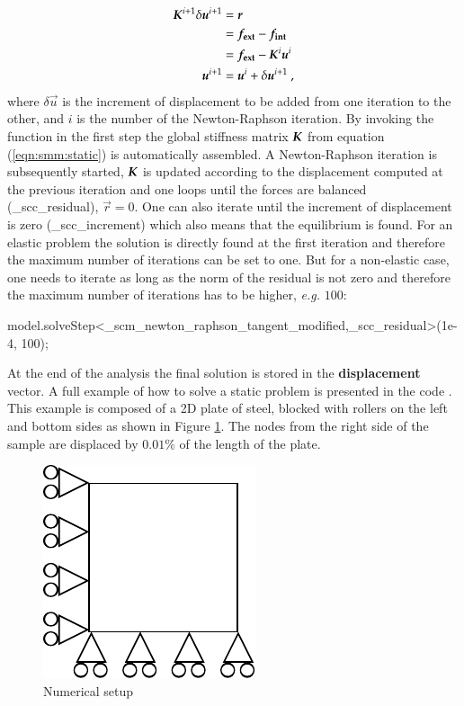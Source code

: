 \begin{align}\label{eqn:smm:static-newton-raphson} 
\boldsymbol{K}^{i+1}\delta\boldsymbol{u}^{i+1} &= \boldsymbol{r} \\ 
&= \boldsymbol{f_{{\mathrm{ext}}}} -\boldsymbol{f_{{\mathrm{int}}}}\\ 
&= \boldsymbol{f_{{\mathrm{ext}}}} - \boldsymbol{K}^{i} \boldsymbol{u}^{i}\\
\boldsymbol{u}^{i+1} &= \boldsymbol{u}^{i} + \delta\boldsymbol{u}^{i+1}~,\nonumber
\end{align}
where $\delta\vec{ u}$ is the increment of displacement to be added
from one iteration to the other, and $i$ is the number of the
Newton-Raphson iteration.  By invoking the  function
in the first step the global stiffness matrix $\boldsymbol{K}$ from equation
(\ref{eqn:smm:static}) is automatically assembled. A Newton-Raphson
iteration is subsequently started, $\boldsymbol{K}$ is updated according to
the displacement computed at the previous iteration and one loops
until the forces are balanced (\_scc\_residual), \ie $\vec{r} = 0$.
One can also iterate until the increment of displacement is zero
(\_scc\_increment) which also means that the equilibrium is found.
For an elastic problem the solution is directly found at the first
iteration and therefore the maximum number of iterations can be set to
one. But for a non-elastic case, one needs to iterate as long as the
norm of the residual is not zero and therefore the maximum number of
iterations has to be higher, \textit{e.g.} $100$:
\begin{cpp} 
model.solveStep<_scm_newton_raphson_tangent_modified,_scc_residual>(1e-4, 100);
\end{cpp} 
At the end of the analysis the final solution is stored in
the \textbf{displacement} vector.  A full example of how to solve a
static problem is presented in the code
.  This example is composed of a
2D plate of steel, blocked with rollers on the left and bottom sides
as shown in Figure \ref{fig:smm:static}.  The nodes from the right
side of the sample are displaced by $0.01\%$ of the length of the
plate.

\begin{figure}[!htb] 
  \centering
  \includegraphics{figures/static}
  \caption{Numerical setup\label{fig:smm:static}}
\end{figure}

